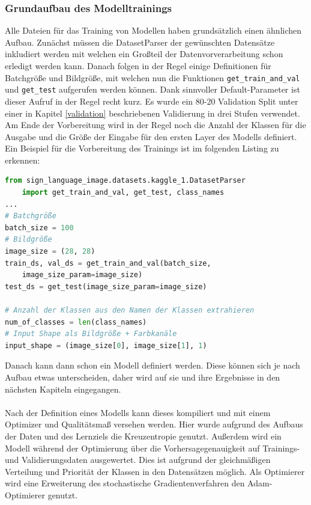 \documentclass[11pt,bibliography=totocnumbered]{scrartcl}
\begin{document}
\subsubsection{Grundaufbau des Modelltrainings}
Alle Dateien für das Training von Modellen haben grundsätzlich einen ähnlichen Aufbau. Zunächst müssen die DatasetParser der gewünschten Datensätze inkludiert werden mit welchen ein Großteil der Datenvorverarbeitung schon erledigt werden kann. Danach folgen in der Regel einige Definitionen für Batchgröße und Bildgröße, mit welchen nun die Funktionen \lstinline[language=pythoninline]|get_train_and_val| und \lstinline[language=pythoninline]|get_test| aufgerufen werden können. Dank sinnvoller Default-Parameter ist dieser Aufruf in der Regel recht kurz. Es wurde ein 80-20 Validation Split unter einer in Kapitel \ref{validation} beschriebenen Validierung in drei Stufen verwendet. Am Ende der Vorbereitung wird in der Regel noch die Anzahl der Klassen für die Ausgabe und die Größe der Eingabe für den ersten Layer des Modells definiert. Ein Beispiel für die Vorbereitung des Trainings ist im folgenden Listing zu erkennen:
\begin{lstlisting}[language=python,firstnumber=1,caption={Beispielhafte Vorbereitung für das Training},label=lst:pre_train]
from sign_language_image.datasets.kaggle_1.DatasetParser
	import get_train_and_val, get_test, class_names 
...
# Batchgröße
batch_size = 100
# Bildgröße
image_size = (28, 28)
train_ds, val_ds = get_train_and_val(batch_size, 
	image_size_param=image_size)
test_ds = get_test(image_size_param=image_size)

# Anzahl der Klassen aus den Namen der Klassen extrahieren
num_of_classes = len(class_names)
# Input Shape als Bildgröße + Farbkanäle
input_shape = (image_size[0], image_size[1], 1)
\end{lstlisting}
Danach kann dann schon ein Modell definiert werden. Diese können sich je nach Aufbau etwas unterscheiden, daher wird auf sie und ihre Ergebnisse in den nächsten Kapiteln eingegangen.
\\\\
Nach der Definition eines Modells kann dieses kompiliert und mit einem Optimizer und Qualitätsmaß versehen werden. Hier wurde aufgrund des Aufbaus der Daten und des Lernziels die Kreuzentropie genutzt. Außerdem wird ein Modell während der Optimierung über die Vorhersagegenauigkeit auf Trainings- und Validierungsdaten ausgewertet. Dies ist aufgrund der gleichmäßigen Verteilung und Priorität der Klassen in den Datensätzen möglich. Als Optimierer wird eine Erweiterung des stochastische Gradientenverfahren den Adam-Optimierer genutzt.
\end{document}
